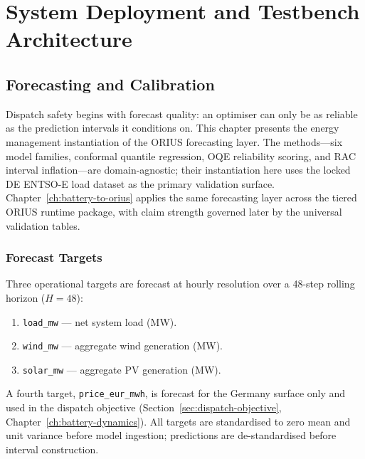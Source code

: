 \chapter{System Deployment and Testbench Architecture}
\label{ch:ch05_architecture_setup}


\section{Forecasting and Calibration}
\label{ch:forecasting}

Dispatch safety begins with forecast quality: an optimiser can only be as
reliable as the prediction intervals it conditions on.  This chapter
presents the energy management instantiation of the ORIUS forecasting
layer.  The methods---six model families, conformal quantile regression,
OQE reliability scoring, and RAC interval inflation---are domain-agnostic;
their instantiation here uses the locked DE ENTSO-E load dataset as the
primary validation surface.  Chapter~\ref{ch:battery-to-orius} applies
the same forecasting layer across the tiered ORIUS runtime package, with
claim strength governed later by the universal validation tables.

\subsection{Forecast Targets}

Three operational targets are forecast at hourly resolution over a
48-step rolling horizon ($H = 48$):

\begin{enumerate}
  \item \texttt{load\_mw} --- net system load (MW).
  \item \texttt{wind\_mw} --- aggregate wind generation (MW).
  \item \texttt{solar\_mw} --- aggregate PV generation (MW).
\end{enumerate}

A fourth target, \texttt{price\_eur\_mwh}, is forecast for the Germany
surface only and used in the dispatch objective
(Section~\ref{sec:dispatch-objective}, Chapter~\ref{ch:battery-dynamics}).
All targets are standardised to zero mean and unit variance before model
ingestion; predictions are de-standardised before interval construction.

